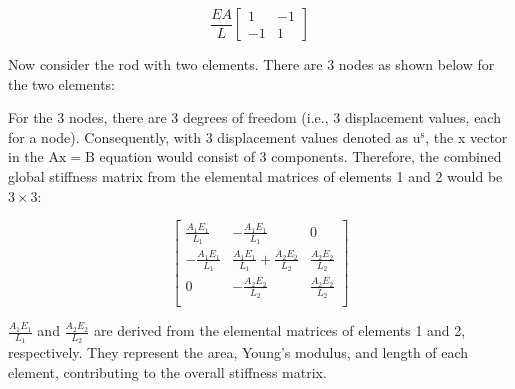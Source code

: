 \documentclass[10pt]{article}
\begin{document}
$$
\frac{E A}{L}\left[\begin{array}{cc}
1 & -1 \\
-1 & 1
\end{array}\right]
$$

Now consider the rod with two elements. There are 3 nodes as shown below for the two elements:

For the 3 nodes, there are 3 degrees of freedom (i.e., 3 displacement values, each for a node). Consequently, with 3 displacement values denoted as $\mathrm{u}^{\mathrm{s}}$, the x vector in the $\mathrm{Ax}=\mathrm{B}$ equation would consist of 3 components. Therefore, the combined global stiffness matrix from the elemental matrices of elements 1 and 2 would be $3 \times 3$:

\begin{equation*}
\left[
\begin{matrix}
\frac{A_1E_1}{L_1} & -\frac{A_1 E_1}{L_1} & 0\\
-\frac{A_1 E_1}{L_1} & {\frac{A_1 E_1}{L_1}} + {\frac{A_2 E_2}{L_2}} & \frac{A_2 E_2}{L_2}\\
0 & -\frac{A_2 E_2}{L_2} & \frac{A_2 E_2}{L_2}\\
\end{matrix}
\right]
\end{equation*}


$\frac{A_1 E_1}{L_1}$ and $\frac{A_2 E_2}{L_2}$ are derived from the elemental matrices of elements 1 and 2, respectively. They represent the area, Young's modulus, and length of each element, contributing to the overall stiffness matrix.
\end{document}

